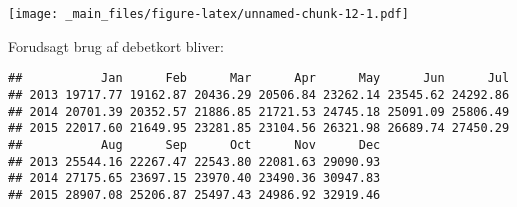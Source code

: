 \documentclass[]{book}
\newenvironment{Shaded}{\begin{snugshade}}{\end{snugshade}}
\newcommand{\DataTypeTok}[1]{\textcolor[rgb]{0.13,0.29,0.53}{#1}}
\newcommand{\DecValTok}[1]{\textcolor[rgb]{0.00,0.00,0.81}{#1}}
\newcommand{\KeywordTok}[1]{\textcolor[rgb]{0.13,0.29,0.53}{\textbf{#1}}}
\newcommand{\NormalTok}[1]{#1}
\newcommand{\OperatorTok}[1]{\textcolor[rgb]{0.81,0.36,0.00}{\textbf{#1}}}
\newcommand{\StringTok}[1]{\textcolor[rgb]{0.31,0.60,0.02}{#1}}
\begin{document}
\begin{Shaded}
\end{Shaded}

\texttt{[image: \_main\_files/figure-latex/unnamed-chunk-12-1.pdf]}

Forudsagt brug af debetkort bliver:

\begin{Shaded}
\end{Shaded}

\begin{verbatim}
##           Jan      Feb      Mar      Apr      May      Jun      Jul
## 2013 19717.77 19162.87 20436.29 20506.84 23262.14 23545.62 24292.86
## 2014 20701.39 20352.57 21886.85 21721.53 24745.18 25091.09 25806.49
## 2015 22017.60 21649.95 23281.85 23104.56 26321.98 26689.74 27450.29
##           Aug      Sep      Oct      Nov      Dec
## 2013 25544.16 22267.47 22543.80 22081.63 29090.93
## 2014 27175.65 23697.15 23970.40 23490.36 30947.83
## 2015 28907.08 25206.87 25497.43 24986.92 32919.46
\end{verbatim}
\end{document}

